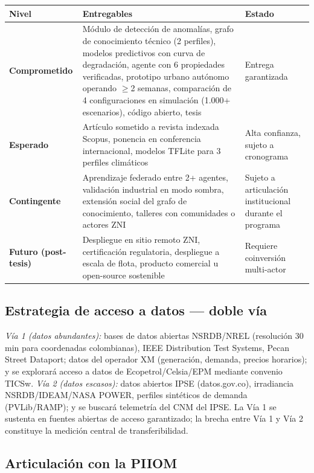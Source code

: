 \documentclass[12pt,letterpaper]{article}
\begin{document}
\begin{longtable}{>{\raggedright\arraybackslash}p{3cm} >{\raggedright\arraybackslash}p{8.5cm} >{\raggedright\arraybackslash}p{3cm}}
\toprule
\textbf{Nivel} & \textbf{Entregables} & \textbf{Estado} \\
\midrule
\endhead
\textbf{Comprometido} & M\'odulo de detecci\'on de anomal\'ias, grafo de conocimiento t\'ecnico (2 perfiles), modelos predictivos con curva de degradaci\'on, agente con 6 propiedades verificadas, prototipo urbano aut\'onomo operando $\geq$2 semanas, comparaci\'on de 4 configuraciones en simulaci\'on (1.000+ escenarios), c\'odigo abierto, tesis & Entrega garantizada \\
\midrule
\textbf{Esperado} & Art\'iculo sometido a revista indexada Scopus, ponencia en conferencia internacional, modelos TFLite para 3 perfiles clim\'aticos & Alta confianza, sujeto a cronograma \\
\midrule
\textbf{Contingente} & Aprendizaje federado entre 2+ agentes, validaci\'on industrial en modo sombra, extensi\'on social del grafo de conocimiento, talleres con comunidades o actores ZNI & Sujeto a articulaci\'on institucional durante el programa \\
\midrule
\textbf{Futuro (post-tesis)} & Despliegue en sitio remoto ZNI, certificaci\'on regulatoria, despliegue a escala de flota, producto comercial u open-source sostenible & Requiere coinversi\'on multi-actor \\
\bottomrule
\end{longtable}

\subsection*{Estrategia de acceso a datos --- doble v\'ia}

\textit{V\'ia 1 (datos abundantes):} bases de datos abiertas NSRDB/NREL (resoluci\'on 30 min para coordenadas colombianas), IEEE Distribution Test Systems, Pecan Street Dataport; datos del operador XM (generaci\'on, demanda, precios horarios); y se explorar\'a acceso a datos de Ecopetrol/Celsia/EPM mediante convenio TICSw. \textit{V\'ia 2 (datos escasos):} datos abiertos IPSE (datos.gov.co), irradiancia NSRDB/IDEAM/NASA POWER, perfiles sint\'eticos de demanda (PVLib/RAMP); y se buscar\'a telemetr\'ia del CNM del IPSE. La V\'ia 1 se sustenta en fuentes abiertas de acceso garantizado; la brecha entre V\'ia 1 y V\'ia 2 constituye la medici\'on central de transferibilidad.

\subsection*{Articulaci\'on con la PIIOM}
\end{document}
